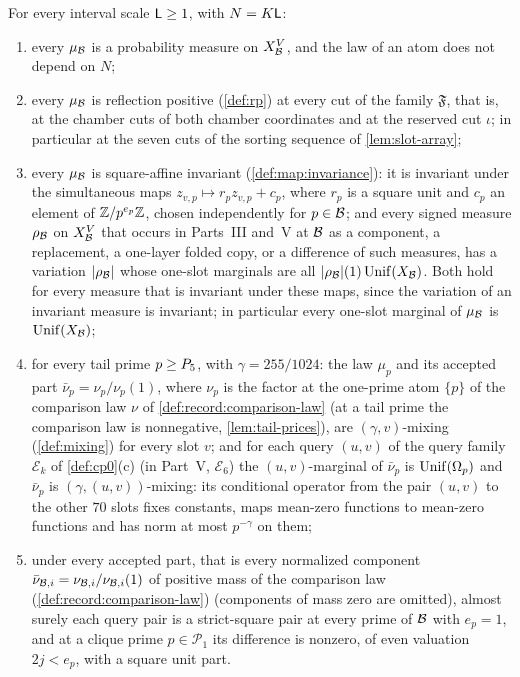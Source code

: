 \begin{hypothesis}\label{hyp:record:reference}
For every interval scale $\mathsf L\ge1$, with $N=K\mathsf L$:
\begin{enumerate}[label=(R\arabic*)]
\item\label{it:record:R1} every $\mu_\mathcal B$ is a probability measure on
 $X_\mathcal B^V$, and the law of an atom does not depend on $N$;
\item\label{it:record:R2} every $\mu_\mathcal B$ is reflection positive
 (\cref{def:rp}) at every cut of the family $\mathfrak F$, that is, at the
 chamber cuts of both chamber coordinates and at the reserved cut $\iota$; in
 particular at the seven cuts of the sorting sequence of \cref{lem:slot-array};
\item\label{it:record:R3} every $\mu_\mathcal B$ is square-affine invariant
 (\cref{def:map:invariance}): it is invariant under the simultaneous maps
 $z_{v,p}\mapsto r_pz_{v,p}+c_p$, where $r_p$ is a square unit and $c_p$
 an element of $\mathbb Z/p^{e_p}\mathbb Z$, chosen independently for $p\in\mathcal B$; and every
 signed measure $\rho_\mathcal B$ on $X_\mathcal B^V$ that occurs in Parts~III and~V at $\mathcal B$ as a component, a replacement, a one-layer folded copy, or a difference of such measures, has a variation $|\rho_\mathcal B|$ whose one-slot marginals are all
 $|\rho_\mathcal B|(1)\operatorname{Unif}(X_\mathcal B)$. Both hold for every measure that is invariant
 under these maps, since the variation of an invariant measure is invariant;
 in particular every one-slot marginal of $\mu_\mathcal B$ is $\operatorname{Unif}(X_\mathcal B)$;
\item\label{it:record:R4} for every tail prime $p\ge P_5$, with
 $\gamma=255/1024$: the law $\mu_p$ and its accepted part
 $\bar\nu_p=\nu_p/\nu_p(1)$, where $\nu_p$ is the factor at the one-prime atom $\{p\}$ of the comparison
 law $\nu$ of \cref{def:record:comparison-law} (at a tail prime the
 comparison law is nonnegative, \cref{lem:tail-prices}), are
 $(\gamma,v)$-mixing
 (\cref{def:mixing}) for every slot $v$; and for each query $(u,v)$ of the
 query family $\mathcal E_k$ of \cref{def:cp0}(c) (in Part~V, $\mathcal E_6$)
 the $(u,v)$-marginal of $\bar\nu_p$ is $\operatorname{Unif}(\Omega_{p})$ and
 $\bar\nu_p$ is $(\gamma,(u,v))$-mixing: its conditional operator from the
 pair $(u,v)$ to the other $70$ slots fixes constants, maps mean-zero functions
 to mean-zero functions and has norm at most $p^{-\gamma}$ on them;
\item\label{it:record:R5} under every accepted part, that is every normalized component $\bar\nu_{\mathcal B,i}=\nu_{\mathcal B,i}/\nu_{\mathcal B,i}(1)$ of positive mass of the comparison law (\cref{def:record:comparison-law}) (components of mass zero are omitted), almost surely each query pair is a
 strict-square pair at every prime of $\mathcal B$ with $e_p=1$, and at a clique
 prime $p\in\mathcal P_1$ its difference is nonzero, of even valuation
 $2j<e_p$, with a square unit part.
\end{enumerate}
\end{hypothesis}

